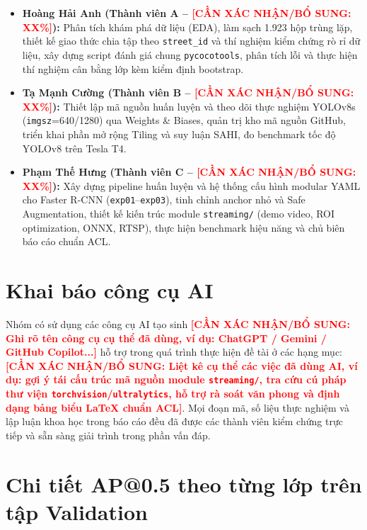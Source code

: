 \documentclass[11pt]{article}
\newcommand{\needconfirm}[1]{\textcolor{red}{\textbf{[CẦN XÁC NHẬN/BỔ SUNG: #1]}}}
\begin{document}
\begin{itemize}
\itemsep0pt
\item \textbf{Hoàng Hải Anh (Thành viên A -- \needconfirm{XX\%}):} Phân tích khám phá dữ liệu (EDA), làm sạch 1.923 hộp trùng lặp, thiết kế giao thức chia tập theo \texttt{street\_id} và thí nghiệm kiểm chứng rò rỉ dữ liệu, xây dựng script đánh giá chung \texttt{pycocotools}, phân tích lỗi và thực hiện thí nghiệm cân bằng lớp kèm kiểm định bootstrap.
\item \textbf{Tạ Mạnh Cường (Thành viên B -- \needconfirm{XX\%}):} Thiết lập mã nguồn huấn luyện và theo dõi thực nghiệm YOLOv8s (\texttt{imgsz}=640/1280) qua Weights \& Biases, quản trị kho mã nguồn GitHub, triển khai phần mở rộng Tiling và suy luận SAHI, đo benchmark tốc độ YOLOv8 trên Tesla T4.
\item \textbf{Phạm Thế Hưng (Thành viên C -- \needconfirm{XX\%}):} Xây dựng pipeline huấn luyện và hệ thống cấu hình modular YAML cho Faster R-CNN (\texttt{exp01}--\texttt{exp03}), tinh chỉnh anchor nhỏ và Safe Augmentation, thiết kế kiến trúc module \texttt{streaming/} (demo video, ROI optimization, ONNX, RTSP), thực hiện benchmark hiệu năng và chủ biên báo cáo chuẩn ACL.
\end{itemize}

\section*{Khai báo công cụ AI}

Nhóm có sử dụng các công cụ AI tạo sinh \needconfirm{Ghi rõ tên công cụ cụ thể đã dùng, ví dụ: ChatGPT / Gemini / GitHub Copilot...} hỗ trợ trong quá trình thực hiện đề tài ở các hạng mục: \needconfirm{Liệt kê cụ thể các việc đã dùng AI, ví dụ: gợi ý tái cấu trúc mã nguồn module \texttt{streaming/}, tra cứu cú pháp thư viện \texttt{torchvision}/\texttt{ultralytics}, hỗ trợ rà soát văn phong và định dạng bảng biểu LaTeX chuẩn ACL}. Mọi đoạn mã, số liệu thực nghiệm và lập luận khoa học trong báo cáo đều đã được các thành viên kiểm chứng trực tiếp và sẵn sàng giải trình trong phần vấn đáp.





\appendix
\section{Chi tiết AP@0.5 theo từng lớp trên tập Validation}
\label{sec:appendix_perclass}
\end{document}
